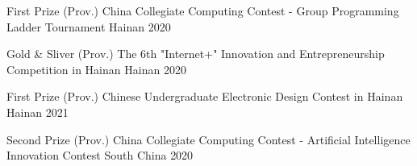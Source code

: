 \begin{cvhonors}
\cvhonor
{First Prize} %
{(Prov.) China Collegiate Computing Contest - Group Programming Ladder Tournament} %
{Hainan} %
{2020} %

\cvhonor
{Gold \& Sliver} %
{(Prov.) The 6th "Internet+" Innovation and Entrepreneurship Competition in Hainan} %
{Hainan} %
{2020} %

\cvhonor
{First Prize} %
{(Prov.) Chinese Undergraduate Electronic Design Contest in Hainan} %
{Hainan} %
{2021} %

\cvhonor
{Second Prize} %
{(Prov.) China Collegiate Computing Contest - Artificial Intelligence Innovation Contest} %
{South China} %
{2020} %





\end{cvhonors}
